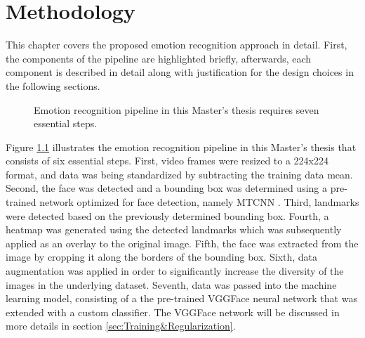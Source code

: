 \chapter{Methodology}
This chapter covers the proposed emotion recognition approach in detail. First, the components of the pipeline are highlighted briefly, afterwards, each component is described in detail along with justification for the design choices in the following sections. 

\begin{figure}[H]
  \begin{center}
  \caption{Emotion recognition pipeline in this Master's thesis requires seven essential steps.}
  \label{fig:MachineLearningModelMethods}
  \end{center}
\end{figure}

Figure \ref{fig:MachineLearningModelMethods} illustrates the emotion recognition pipeline in this Master's thesis that consists of six essential steps. First, video frames were resized to a 224x224 format, and data was being standardized by subtracting the training data mean. Second, the face was detected and a bounding box was determined using a pre-trained network optimized for face detection, namely MTCNN \citep{Zhang:2016:MTCCN}. Third, landmarks were detected based on the previously determined bounding box. 
\newline\newline
Fourth, a heatmap was generated using the detected landmarks which was subsequently applied as an overlay to the original image. Fifth, the face was extracted from the image by cropping it along the borders of the bounding box. Sixth, data augmentation was applied in order to significantly increase the diversity of the images in the underlying dataset. Seventh, data was passed into the machine learning model, consisting of a the pre-trained VGGFace \citep{Cao:2018:VGGFace2} neural network that was extended with a custom classifier. The VGGFace network will be discussed in more details in section \ref{sec:Training&Regularization}.

